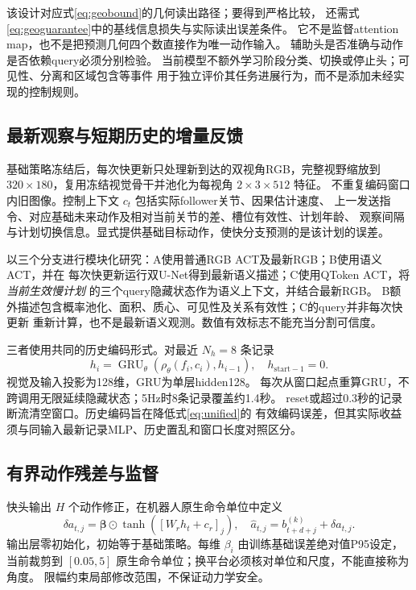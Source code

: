 该设计对应式\eqref{eq:geobound}的几何读出路径；要得到严格比较，
还需式\eqref{eq:geoguarantee}中的基线信息损失与实际读出误差条件。
它不是监督attention map，也不是把预测几何四个数直接作为唯一动作输入。
辅助头是否准确与动作是否依赖query必须分别检验。
当前模型不额外学习阶段分类、切换或停止头；可见性、分离和区域包含等事件
用于独立评价其任务进展行为，而不是添加未经实现的控制规则。

\subsection{最新观察与短期历史的增量反馈}
基础策略冻结后，每次快更新只处理新到达的双视角RGB，完整视野缩放到
$320\times180$，复用冻结视觉骨干并池化为每视角 $2\times3\times512$ 特征。
不重复编码窗口内旧图像。控制上下文 $c_t$ 包括实际follower关节、因果估计速度、
上一发送指令、对应基础未来动作及相对当前关节的差、槽位有效性、计划年龄、
观察间隔与计划切换信息。显式提供基础目标动作，使快分支预测的是该计划的误差。

以三个分支进行模块化研究：A使用普通RGB ACT及最新RGB；B使用语义ACT，并在
每次快更新运行双U-Net得到最新语义描述；C使用QToken ACT，将\emph{当前生效慢计划}
的三个query隐藏状态作为语义上下文，并结合最新RGB。
B额外描述包含概率池化、面积、质心、可见性及关系有效性；C的query并非每次快更新
重新计算，也不是最新语义观测。数值有效标志不能充当分割可信度。

三者使用共同的历史编码形式。对最近 $N_h=8$ 条记录
\begin{equation}
 h_i=\operatorname{GRU}_\theta(\rho_\theta(f_i,c_i),h_{i-1}),
 \quad h_{\mathrm{start}-1}=0.
 \label{eq:history}
\end{equation}
视觉及输入投影为128维，GRU为单层hidden128。
每次从窗口起点重算GRU，不跨调用无限延续隐藏状态；5Hz时8条记录覆盖约1.4秒。
reset或超过0.3秒的记录断流清空窗口。历史编码旨在降低式\eqref{eq:unified}的
有效编码误差，但其实际收益须与同输入最新记录MLP、历史置乱和窗口长度对照区分。

\subsection{有界动作残差与监督}
快头输出 $H$ 个动作修正，在机器人原生命令单位中定义
\begin{equation}
 \delta a_{t,j}=\bm\beta\odot\tanh([W_rh_t+c_r]_j),
 \quad \widehat a_{t,j}=b^{(k)}_{t+d+j}+\delta a_{t,j}.
 \label{eq:action}
\end{equation}
输出层零初始化，初始等于基础策略。每维 $\beta_i$ 由训练基础误差绝对值P95设定，
当前裁剪到 $[0.05,5]$ 原生命令单位；换平台必须核对单位和尺度，不能直接称为角度。
限幅约束局部修改范围，不保证动力学安全。


